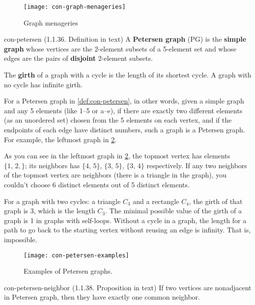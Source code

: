 \documentclass[../src/handouts/main.tex]{subfiles}
\begin{document}
\begin{figure}[htbp]
  \centering
  \texttt{[image: con-graph-menageries]}
  \caption{Graph menageries}
  \label{fig:con-graph-menageries}
\end{figure}

\begin{definition}{}{con-petersen}
  (1.1.36. Definition in text)
  A \textbf{Petersen graph} (PG) is the \textbf{simple graph} whose vertices are the 2-element subsets of a 5-element set and whose edges are the pairs of \textbf{disjoint} 2-element subsets.

  The \textbf{girth} of a graph with a cycle is the length of its shortest cycle. A graph with no cycle has infinite girth.
\end{definition}

For a Petersen graph in \cref{def:con-petersen}, in other words, given a simple graph and any 5 elements (like 1--5 or a--e), if there are exactly two different elements (as an unordered set) chosen from the 5 elements on each vertex, and if the endpoints of each edge have distinct numbers, such a graph is a Petersen graph. For example, the leftmost graph in \cref{fig:con-petersen-examples}.

As you can see in the leftmost graph in \cref{fig:con-petersen-examples}, the topmost vertex has elements $\{ 1,\, 2, \}$; its neighbors has $\{ 4,\, 5 \}$, $\{ 3,\, 5 \}$, $\{ 3,\, 4 \}$ respectively. If any two neighbors of the topmost vertex are neighbors (there is a triangle in the graph), you couldn't choose 6 distinct elements out of 5 distinct elements.

For a graph with two cycles: a triangle $C_3$ and a rectangle $C_4$, the girth of that graph is 3, which is the length $C_3$. The minimal possible value of the girth of a graph is 1 in graphs with self-loops. Without a cycle in a graph, the length for a path to go back to the starting vertex without reusing an edge is infinity. That is, impossible.

\begin{figure}[htbp]
  \centering
  \texttt{[image: con-petersen-examples]}
  \caption{Examples of Petersen graphs.}
  \label{fig:con-petersen-examples}
\end{figure}

\begin{proposition}{}{con-petersen-neighbor}
  (1.1.38. Proposition in text)
  If two vertices are nonadjacent in Petersen graph, then they have exactly one common neighbor.
\end{proposition}
\end{document}
